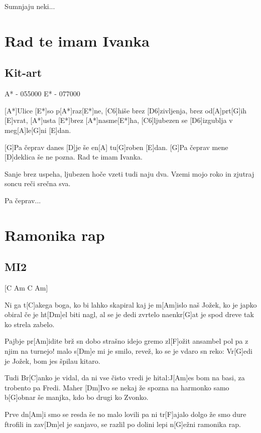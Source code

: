\documentclass[a4paper,12pt]{article}
\begin{document}
\begin{multicols}{2}
\begin{guitar}
Sumnjaju neki...

\end{guitar}
\section{Rad te imam Ivanka}
\subsection*{Kit-art}
\begin{guitar}
A* - 055000
E* - 077000


[A*]Ulice [E*]so p[A*]raz[E*]ne,
[C6]hiše brez [D6]zivljenja, brez od[A]prt[G]ih [E]vrat,
[A*]usta [E*]brez [A*]nasme[E*]ha,
[C6]ljubezen se [D6]izgublja v meg[A]le[G]ni [E]dan.



[G]Pa čeprav danes [D]je še en[A] tu[G]roben [E]dan.
[G]Pa čeprav mene [D]deklica še ne pozna.
Rad te imam Ivanka.



Sanje brez uspeha,
ljubezen hoče vzeti tudi naju dva.
Vzemi mojo roko in zjutraj soncu reči
srečna sva.



Pa čeprav...

\end{guitar}
\section{Ramonika rap}
\subsection*{MI2}
\begin{guitar}

[C Am C Am]


Ni ga t[C]akega boga, ko bi lahko skapiral
kaj je m[Am]islo naš Jožek, ko je japko obiral
če je ht[Dm]el biti nagl, al se je dedi zvrtelo
naenkr[G]at je spod dreve tak ko strela zabelo.


Pajbje pr[Am]idite brž sn dobo strašno idejo
gremo zl[F]ožit ansambel pol pa z njim na turnejo!
malo s[Dm]e mi je smilo, revež, ko se je vdaro
sn reko: Vr[G]edi je Jožek, bom jes špilau kitaro.


Tudi Br[C]anko je vidal, da ni vse čisto vredi
je hital:J[Am]es bom na basi, za trobento pa Fredi.
Maher [Dm]Ivo se nekaj že spozna na harmonko
samo b[G]obnar še manjka, kdo bo drugi ko Zvonko.


Prve dn[Am]i smo se resda še no malo lovili
pa ni tr[F]ajalo dolgo že smo dure ftrofili
in zav[Dm]el je sanjavo, se razlil po dolini
lepi n[G]ežni ramonika rap.



\end{guitar}
\end{multicols}
\end{document}
